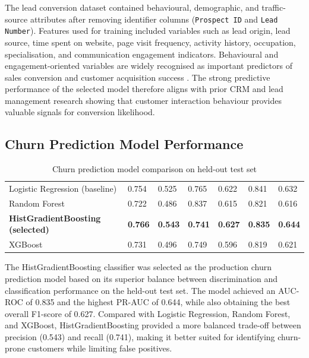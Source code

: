 The lead conversion dataset contained behavioural, demographic, and
traffic-source attributes after removing identifier columns
(\texttt{Prospect ID} and \texttt{Lead Number}). Features used for
training included variables such as lead origin, lead source, time spent
on website, page visit frequency, activity history, occupation,
specialisation, and communication engagement indicators. Behavioural and
engagement-oriented variables are widely recognised as important
predictors of sales conversion and customer acquisition success
\citep{jolson1997,tsai2010}. The strong predictive performance of the
selected model therefore aligns with prior CRM and lead management
research showing that customer interaction behaviour provides valuable
signals for conversion likelihood.

\subsection{Churn Prediction Model Performance}

\begin{table}[H]
  \centering
  \caption{Churn prediction model comparison on held-out test set}
  \label{tab:churn_results}
  \begin{tabularx}{\textwidth}{@{}L{3.8cm} C{1.5cm} C{1.5cm} C{1.5cm}
    C{1.5cm} C{1.6cm} C{1.6cm}@{}}
    \toprule
     &  &  &  &
     &  &  \\
    \midrule
    Logistic Regression (baseline) &
      0.754 & 0.525 & 0.765 & 0.622 & 0.841 & 0.632 \\
    Random Forest &
      0.722 & 0.486 & 0.837 & 0.615 & 0.821 & 0.616 \\
    \textbf{HistGradientBoosting (selected)} &
      \textbf{0.766} & \textbf{0.543} & \textbf{0.741} &
      \textbf{0.627} & \textbf{0.835} & \textbf{0.644} \\
    XGBoost &
      0.731 & 0.496 & 0.749 & 0.596 & 0.819 & 0.621 \\
    \bottomrule
  \end{tabularx}
\end{table}

The HistGradientBoosting classifier was selected as the production churn
prediction model based on its superior balance between discrimination
and classification performance on the held-out test set. The model
achieved an AUC-ROC of 0.835 and the highest PR-AUC of 0.644, while
also obtaining the best overall F1-score of 0.627. Compared with
Logistic Regression, Random Forest, and XGBoost,
HistGradientBoosting provided a more balanced trade-off between
precision (0.543) and recall (0.741), making it better suited for
identifying churn-prone customers while limiting false positives.

